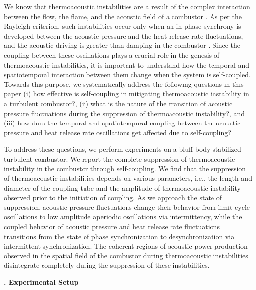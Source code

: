 \documentclass[twocolumn,10pt]{article} %
\renewcommand{\section}%
              [1]%
              {%
               \bgroup%
               \flushleft%
               \small\bf%
               \stepcounter{section}%
               \arabic{section}. #1%
               \par%
               \egroup%
              }%
\begin{document}
We know that thermoacoustic instabilities are a result of the complex interaction between the flow, the flame, and the acoustic field of a combustor \cite{sujith2021thermoacoustic}. As per the Rayleigh criterion, such instabilities occur only when an in-phase synchrony is developed between the acoustic pressure and the heat release rate fluctuations, and the acoustic driving is greater than damping in the combustor \cite{lieuwen2005combustion}. Since the coupling between these oscillations plays a crucial role in the genesis of thermoacoustic instabilities, it is important to understand how the temporal and spatiotemporal interaction between them change when the system is self-coupled. Towards this purpose, we systematically address the following questions in this paper \textendash \hspace{0.5} (i) how effective is self-coupling in mitigating thermoacoustic instability in a turbulent combustor?, (ii) what is the nature of the transition of acoustic pressure fluctuations during the suppression of thermoacoustic instability?, and (iii) how does the temporal and spatiotemporal coupling between the acoustic pressure and heat release rate oscillations get affected due to self-coupling? 

To address these questions, we perform experiments on a bluff-body stabilized turbulent combustor. We report the complete suppression of thermoacoustic instability in the combustor through self-coupling. We find that the suppression of thermoacoustic instabilities depends on various parameters, i.e., the length and diameter of the coupling tube and the amplitude of thermoacoustic instability observed prior to the initiation of coupling. As we approach the state of suppression, acoustic pressure fluctuations change their behavior from limit cycle oscillations to low amplitude aperiodic oscillations via intermittency, while the coupled behavior of acoustic pressure and heat release rate fluctuations transitions from the state of phase synchronization to desynchronization via intermittent synchronization. The coherent regions of acoustic power production observed in the spatial field of the combustor during thermoacoustic instabilities disintegrate completely during the suppression of these instabilities.

\section{Experimental Setup} \addvspace{10pt}
\end{document}
